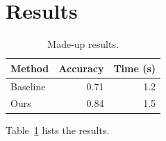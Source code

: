 \section{Results}\label{sec:results}
\begin{table}[ht]
  \centering
  \begin{tabular}{lrr}
    \toprule
    Method & Accuracy & Time (s) \\
    \midrule
    Baseline & 0.71 & 1.2 \\
    Ours     & 0.84 & 1.5 \\
    \bottomrule
  \end{tabular}
  \caption{Made-up results.}\label{tab:results}
\end{table}
Table~\ref{tab:results} lists the results.




